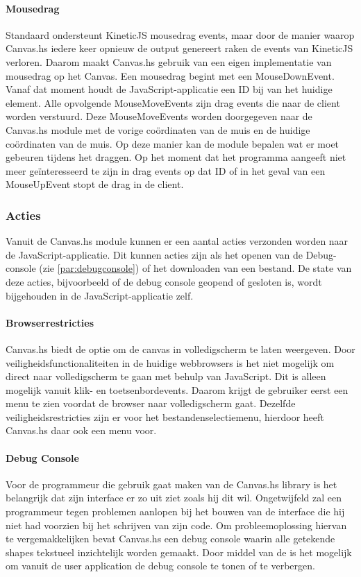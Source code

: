 \paragraph{Mousedrag}
Standaard ondersteunt KineticJS mousedrag events, maar door de manier waarop Canvas.hs iedere keer opnieuw de output genereert raken de events van KineticJS verloren. Daarom maakt Canvas.hs gebruik van een eigen implementatie van mousedrag op het Canvas. Een mousedrag begint met een MouseDownEvent. Vanaf dat moment houdt de JavaScript-applicatie een ID bij van het huidige element. Alle opvolgende MouseMoveEvents zijn drag events die naar de client worden verstuurd. Deze MouseMoveEvents worden doorgegeven naar de Canvas.hs module met de vorige coördinaten van de muis en de huidige coördinaten van de muis.
Op deze manier kan de module bepalen wat er moet gebeuren tijdens het draggen. Op het moment dat het programma aangeeft niet meer ge\"interesseerd te zijn in drag events op dat ID of in het geval van een MouseUpEvent stopt de drag in de client.

\subsubsection{Acties}
Vanuit de Canvas.hs module kunnen er een aantal acties verzonden worden naar de JavaScript-applicatie. Dit kunnen acties zijn als het openen van de Debug-console (zie \autoref{par:debugconsole}) of het downloaden van een bestand. De state van deze acties, bijvoorbeeld of de debug console geopend of gesloten is, wordt bijgehouden in de JavaScript-applicatie zelf.

\paragraph{Browserrestricties}
Canvas.hs biedt de optie om de canvas in volledigscherm te laten weergeven. Door veiligheidsfunctionaliteiten in de huidige webbrowsers is het niet mogelijk om direct naar volledigscherm te gaan met behulp van JavaScript. Dit is alleen mogelijk vanuit klik- en toetsenbordevents. Daarom krijgt de gebruiker eerst een menu te zien voordat de browser naar volledigscherm gaat. Dezelfde veiligheidsrestricties zijn er voor het bestandenselectiemenu, hierdoor heeft Canvas.hs daar ook een menu voor.

\paragraph{Debug Console} \label{par:debugconsole}
Voor de programmeur die gebruik gaat maken van de Canvas.hs library is het belangrijk dat zijn interface er zo uit ziet zoals hij dit wil. Ongetwijfeld zal een programmeur tegen problemen aanlopen bij het bouwen van de interface die hij niet had voorzien bij het schrijven van zijn code. Om probleemoplossing hiervan te vergemakkelijken bevat Canvas.hs een debug console waarin alle getekende shapes tekstueel inzichtelijk worden gemaakt. Door middel van de  is het mogelijk om vanuit de user application de debug console te tonen of te verbergen.
